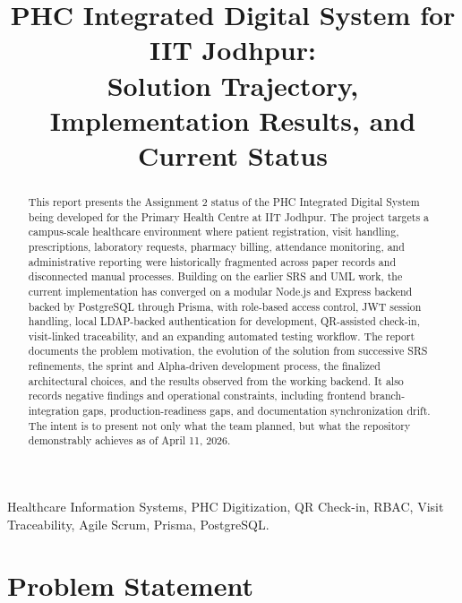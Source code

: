 \documentclass[conference]{IEEEtran}
\begin{document}
\title{PHC Integrated Digital System for IIT Jodhpur:\\
Solution Trajectory, Implementation Results, and Current Status}

\author{
\and
{}
\and
{}
}

\maketitle

\begin{abstract}
This report presents the Assignment 2 status of the PHC Integrated Digital System being developed for the Primary Health Centre at IIT Jodhpur. The project targets a campus-scale healthcare environment where patient registration, visit handling, prescriptions, laboratory requests, pharmacy billing, attendance monitoring, and administrative reporting were historically fragmented across paper records and disconnected manual processes. Building on the earlier SRS and UML work, the current implementation has converged on a modular Node.js and Express backend backed by PostgreSQL through Prisma, with role-based access control, JWT session handling, local LDAP-backed authentication for development, QR-assisted check-in, visit-linked traceability, and an expanding automated testing workflow. The report documents the problem motivation, the evolution of the solution from successive SRS refinements, the sprint and Alpha-driven development process, the finalized architectural choices, and the results observed from the working backend. It also records negative findings and operational constraints, including frontend branch-integration gaps, production-readiness gaps, and documentation synchronization drift. The intent is to present not only what the team planned, but what the repository demonstrably achieves as of April 11, 2026.
\end{abstract}

\begin{IEEEkeywords}
Healthcare Information Systems, PHC Digitization, QR Check-in, RBAC, Visit Traceability, Agile Scrum, Prisma, PostgreSQL.
\end{IEEEkeywords}

\section{Problem Statement}
\end{document}
